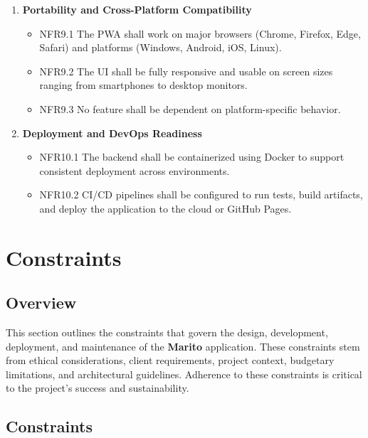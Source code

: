 \documentclass[12pt]{article}
\begin{document}
\begin{enumerate}[label=NFR\arabic*:, leftmargin=2.5em]
    \item \textbf{Portability and Cross-Platform Compatibility}
    \begin{itemize}
        \item NFR9.1 The PWA shall work on major browsers (Chrome, Firefox, Edge, Safari) and platforms (Windows, Android, iOS, Linux).
        \item NFR9.2 The UI shall be fully responsive and usable on screen sizes ranging from smartphones to desktop monitors.
        \item NFR9.3 No feature shall be dependent on platform-specific behavior.
    \end{itemize}
    
    \item \textbf{Deployment and DevOps Readiness}
    \begin{itemize}
        \item NFR10.1 The backend shall be containerized using Docker to support consistent deployment across environments.
        \item NFR10.2 CI/CD pipelines shall be configured to run tests, build artifacts, and deploy the application to the cloud or GitHub Pages.
    \end{itemize}
\end{enumerate}


\section{Constraints}

\subsection{Overview}
This section outlines the constraints that govern the design, development, deployment, and maintenance of the \textbf{Marito} application. These constraints stem from ethical considerations, client requirements, project context, budgetary limitations, and architectural guidelines. Adherence to these constraints is critical to the project's success and sustainability.

\subsection{Constraints}
\end{document}
